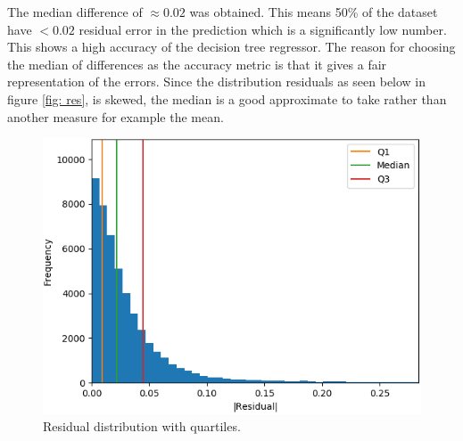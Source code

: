The median difference of $\approx0.02$ was obtained. This means 50\% of the dataset have $< 0.02$ residual error in the prediction which is a significantly low number. This shows a high accuracy of the decision tree regressor. The reason for choosing the median of differences as the accuracy metric is that it gives a fair representation of the errors. Since the distribution residuals as seen below in figure \ref{fig: res}, is skewed, the median is a good approximate to take rather than another measure for example the mean.
\begin{figure}[H]
	\centering
	\includegraphics[width=\linewidth,keepaspectratio]{images/misc/residuals.png}
	\caption{Residual distribution with quartiles.}
	\label{fig:res}
\end{figure}


